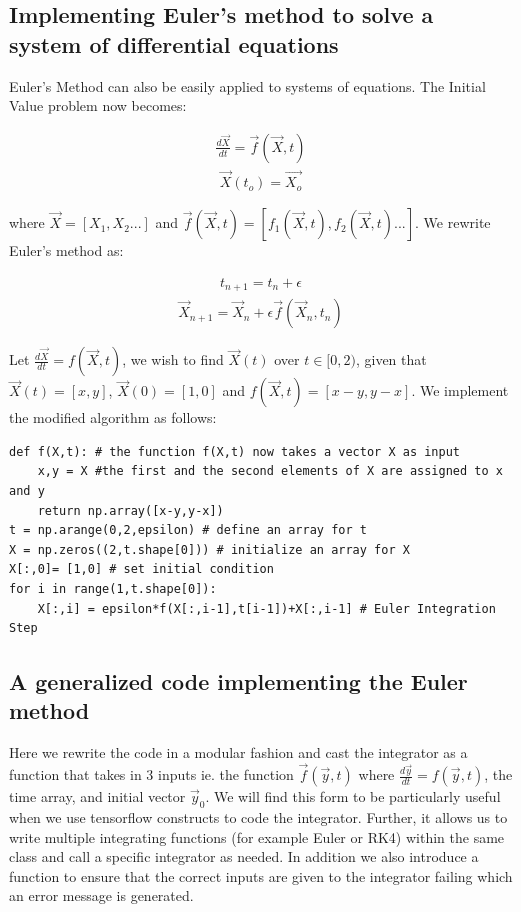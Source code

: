 \documentclass[10pt,letterpaper]{article}
\begin{document}
\subsection*{Implementing Euler's method to solve a system of differential equations}

Euler's Method can also be easily applied to systems of equations. The Initial Value problem now becomes:

\begin{eqnarray}\frac{d\vec{X}}{dt} = \vec{f}(\vec{X}, t)\end{eqnarray}
\begin{eqnarray}\vec{X}(t_o) = \vec{X_o}\end{eqnarray}

where $\vec{X}=[X_1,X_2...]$ and $\vec{f}(\vec{X}, t)=[f_1(\vec{X}, t),f_2(\vec{X}, t)...]$. We rewrite Euler's method as:

\begin{eqnarray}t_{n+1} = t_n + \epsilon \end{eqnarray}
\begin{eqnarray}\vec{X}_{n+1} = \vec{X}_n + \epsilon \vec{f}(\vec{X}_n, t_n)\end{eqnarray}

Let $\frac{d\vec{X}}{dt}=f(\vec{X},t)$, we wish to find $\vec{X}(t)$ over $t\in[0,2)$, given that $\vec{X}(t)=[x,y]$, $\vec{X}(0)=[1,0]$ and $f(\vec{X},t) = [x-y,y-x]$. We implement the modified algorithm as follows:

\begin{verbatim}
def f(X,t): # the function f(X,t) now takes a vector X as input
    x,y = X #the first and the second elements of X are assigned to x and y
    return np.array([x-y,y-x])
t = np.arange(0,2,epsilon) # define an array for t
X = np.zeros((2,t.shape[0])) # initialize an array for X
X[:,0]= [1,0] # set initial condition
for i in range(1,t.shape[0]):
    X[:,i] = epsilon*f(X[:,i-1],t[i-1])+X[:,i-1] # Euler Integration Step
\end{verbatim}

\subsection*{A generalized code implementing the Euler method}
Here we rewrite the code in a modular fashion and cast the integrator as a function that takes in 3 inputs ie. the function $\vec{f}(\vec{y},t)$ where $\frac{d\vec{y}}{dt}=f(\vec{y},t)$, the time array, and initial vector $\vec{y}_{0}$. We will find this form to be particularly useful when we use tensorflow constructs to code the integrator. Further, it allows us to write multiple integrating functions (for example Euler or RK4) within the same class and call a specific integrator as needed. In addition we also introduce a function to ensure that the correct inputs are given to the integrator failing which an error message is generated. 
\end{document}
